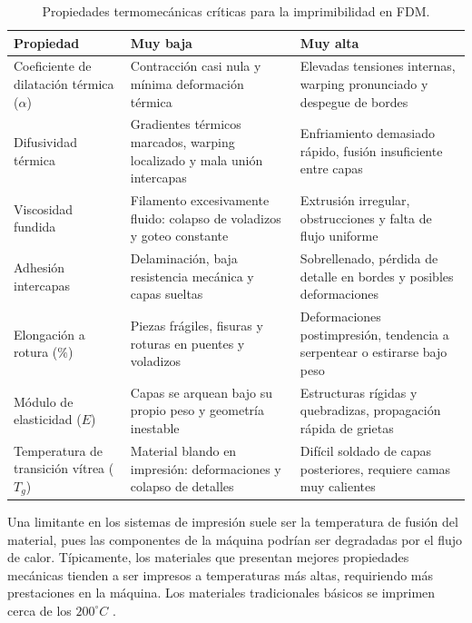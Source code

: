 \begin{table}[h]
  \centering
  \footnotesize
  \begin{tabular}{|p{3cm}|p{5cm}|p{5cm}|}
    \hline
    \textbf{Propiedad} & \textbf{Muy baja} & \textbf{Muy alta} \\
    \hline
    Coeficiente de dilatación térmica (\(\alpha\)) 
      & Contracción casi nula y mínima deformación térmica 
      & Elevadas tensiones internas, warping pronunciado y despegue de bordes \\
    \hline
    Difusividad térmica 
      & Gradientes térmicos marcados, warping localizado y mala unión intercapas 
      & Enfriamiento demasiado rápido, fusión insuficiente entre capas \\
    \hline
    Viscosidad fundida 
      & Filamento excesivamente fluido: colapso de voladizos y goteo constante 
      & Extrusión irregular, obstrucciones y falta de flujo uniforme \\
    \hline
    Adhesión intercapas 
      & Delaminación, baja resistencia mecánica y capas sueltas 
      & Sobrellenado, pérdida de detalle en bordes y posibles deformaciones \\
    \hline
    Elongación a rotura (\(\%\)) 
      & Piezas frágiles, fisuras y roturas en puentes y voladizos 
      & Deformaciones postimpresión, tendencia a serpentear o estirarse bajo peso \\
    \hline
    Módulo de elasticidad (\(E\)) 
      & Capas se arquean bajo su propio peso y geometría inestable 
      & Estructuras rígidas y quebradizas, propagación rápida de grietas \\
    \hline
    Temperatura de transición vítrea (\(T_g\)) 
      & Material blando en impresión: deformaciones y colapso de detalles 
      & Difícil soldado de capas posteriores, requiere camas muy calientes \\
    \hline
  \end{tabular}
  \caption{Propiedades termomecánicas críticas para la imprimibilidad en FDM.}
  \label{3param}
\end{table}

Una limitante en los sistemas de impresión suele ser la temperatura de fusión del material, pues las componentes de la máquina podrían ser degradadas por el flujo de calor. Típicamente, los materiales que presentan mejores propiedades mecánicas tienden a ser impresos a temperaturas más altas, requiriendo más prestaciones en la máquina. Los materiales tradicionales básicos se imprimen cerca de los $200^{\circ}C$ .

